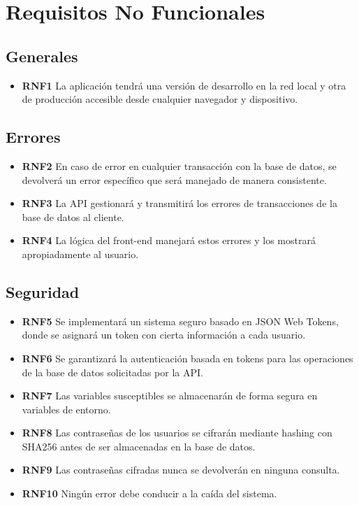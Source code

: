 \section{Requisitos No Funcionales}

\subsection{Generales}
\begin{itemize}
    \item \textbf{RNF1} La aplicación tendrá una versión de desarrollo en la red local y otra de producción accesible desde cualquier navegador y dispositivo.
\end{itemize}

\subsection{Errores}
\begin{itemize}
    \item \textbf{RNF2} En caso de error en cualquier transacción con la base de datos, se devolverá un error específico que será manejado de manera consistente.
    \item \textbf{RNF3} La API gestionará y transmitirá los errores de transacciones de la base de datos al cliente.
    \item \textbf{RNF4} La lógica del front-end manejará estos errores y los mostrará apropiadamente al usuario.
\end{itemize}

\subsection{Seguridad}
\begin{itemize}
    \item \textbf{RNF5} Se implementará un sistema seguro basado en JSON Web Tokens, donde se asignará un token con cierta información a cada usuario.
    \item \textbf{RNF6} Se garantizará la autenticación basada en tokens para las operaciones de la base de datos solicitadas por la API.
    \item \textbf{RNF7} Las variables susceptibles se almacenarán de forma segura en variables de entorno.
    \item \textbf{RNF8} Las contraseñas de los usuarios se cifrarán mediante hashing con SHA256 antes de ser almacenadas en la base de datos.
    \item \textbf{RNF9} Las contraseñas cifradas nunca se devolverán en ninguna consulta.
    \item \textbf{RNF10} Ningún error debe conducir a la caída del sistema.
\end{itemize}

